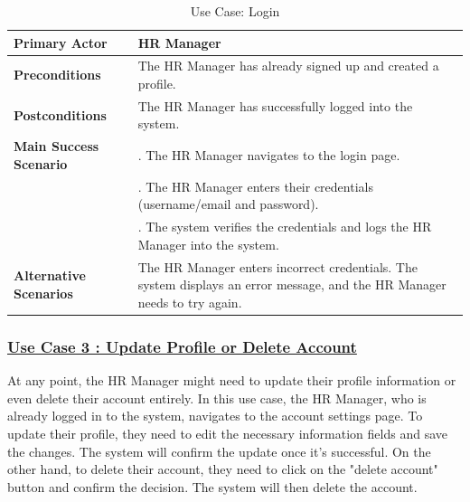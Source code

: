 \begin{table}[H]
    \renewcommand{\arraystretch}{1.5}%
    \caption{Use Case: Login}
    \centering
    \medskip
    \begin{tabularx}{\textwidth} {
            | >{\hsize=0.5\hsize\raggedright\arraybackslash}X
            | >{\hsize=1.5\hsize\raggedright\arraybackslash}X |}
        \hline
        \textbf{Primary Actor} & HR Manager \\
        \hline
        \textbf{Preconditions} & The HR Manager has already signed up and created a profile. \\
        \hline
        \textbf{Postconditions} & The HR Manager has successfully logged into the system. \\
        \hline
        \textbf{Main Success Scenario} & 1. The HR Manager navigates to the login page. \\
        & 2. The HR Manager enters their credentials (username/email and password). \\
        & 3. The system verifies the credentials and logs the HR Manager into the system. \\
        \hline
        \textbf{Alternative Scenarios} & The HR Manager enters incorrect credentials. The system displays an error message, and the HR Manager needs to try again. \\
        \hline
    \end{tabularx}
\end{table}


\subsubsection{\underline{Use Case 3 : Update Profile or Delete Account }}
At any point, the HR Manager might need to update their profile information or even delete their account entirely. In this use case, the HR Manager, who is already logged in to the system, navigates to the account settings page. To update their profile, they need to edit the necessary information fields and save the changes. The system will confirm the update once it's successful. On the other hand, to delete their account, they need to click on the "delete account" button and confirm the decision. The system will then delete the account.

